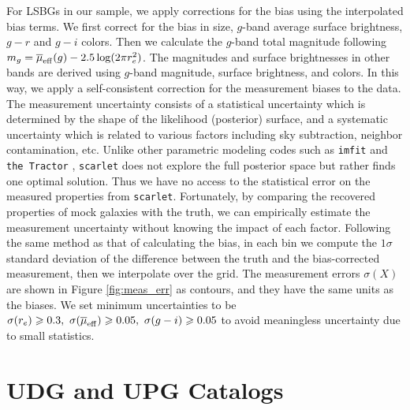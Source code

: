 \documentclass[twocolumn,astrosymb,twocolappendix]{aastex631}
\newcommand{\code}[1]{\texttt{#1}}
\begin{document}
\begin{CJK*}{UTF8}{gbsn}
For LSBGs in our sample, we apply corrections for the bias using the interpolated bias terms. We first correct for the bias in size, $g$-band average surface brightness, $g-r$ and $g-i$ colors. Then we calculate the $g$-band total magnitude following $m_g = \overline{\mu}_{\rm eff}(g) - 2.5\log(2\pi r_e^2)$. The magnitudes and surface brightnesses in other bands are derived using $g$-band magnitude, surface brightness, and colors. In this way, we apply a self-consistent correction for the measurement biases to the data. 
The measurement uncertainty consists of a statistical uncertainty which is determined by the shape of the likelihood (posterior) surface, and a systematic uncertainty which is related to various factors including sky subtraction, neighbor contamination, etc. Unlike other parametric modeling codes such as \code{imfit} \citep{imfit} and \code{the Tractor} \citep{Lang2016}, \code{scarlet} does not explore the full posterior space but rather finds one optimal solution. Thus we have no access to the statistical error on the measured properties from \code{scarlet}. Fortunately, by comparing the recovered properties of mock galaxies with the truth, we can empirically estimate the measurement uncertainty without knowing the impact of each factor. Following the same method as that of calculating the bias, in each bin we compute the $1\sigma$ standard deviation of the difference between the truth and the bias-corrected measurement, then we interpolate over the grid. The measurement errors $\sigma(X)$ are shown in Figure \ref{fig:meas_err} as contours, and they have the same units as the biases. We set minimum uncertainties to be $\sigma(r_e) \geqslant 0.3,\ \sigma(\overline{\mu}_{\rm eff}) \geqslant 0.05,\ \sigma(g-i) \geqslant 0.05$ to avoid meaningless uncertainty due to small statistics.


\section{UDG and UPG Catalogs}
\onecolumngrid 


\end{CJK*}
\end{document}
